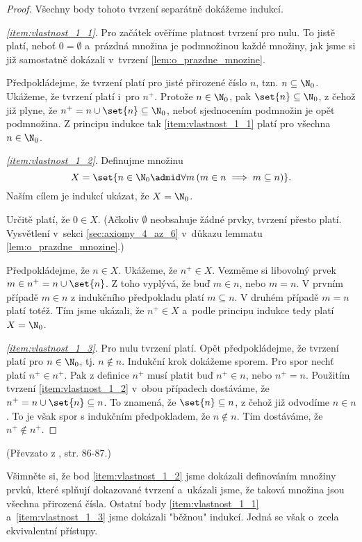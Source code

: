 \begin{proof}
    Všechny body tohoto tvrzení separátně dokážeme indukcí.\par
    \textit{\ref{item:vlastnost_1_1}}. Pro začátek ověříme platnost tvrzení pro nulu. To jistě platí, neboť $0=\emptyset$ a~prázdná množina je podmnožinou každé množiny, jak jsme si již samostatně dokázali v~tvrzení \ref{lem:o_prazdne_mnozine}.\par
    Předpokládejme, že tvrzení platí pro jisté přirozené číslo $n$, tzn. $n\subseteq\N_0$. Ukážeme, že tvrzení platí i~pro $n^+$. Protože $n\in\N_0$, pak $\set{n}\subseteq\N_0$, z čehož již plyne, že $n^+=n\cup\set{n}\subseteq\N_0$, neboť sjednocením podmnožin je opět podmnožina. Z principu indukce tak \ref{item:vlastnost_1_1} platí pro všechna $n\in\N_0$.\par
    \textit{\ref{item:vlastnost_1_2}}. Definujme množinu
    \begin{equation*}
        X=\set{n\in\N_0\admid \forall m\,(m\in n\implies m\subseteq n)}.
    \end{equation*} 
    Naším cílem je indukcí ukázat, že $X=\N_0$.\par
    Určitě platí, že $0\in X$. (Ačkoliv $\emptyset$ neobsahuje žádné prvky, tvrzení přesto platí. Vysvětlení v~sekci \ref{sec:axiomy_4_az_6} v~důkazu lemmatu \ref{lem:o_prazdne_mnozine}.)\par
    Předpokládejme, že $n\in X$. Ukážeme, že $n^+\in X$. Vezměme si libovolný prvek $m\in n^+=n\cup\set{n}$. Z toho vyplývá, že buď $m\in n$, nebo $m=n$. V prvním případě $m\in n$ z indukčního předpokladu platí $m\subseteq n$. V druhém případě $m=n$ platí totéž. Tím jsme ukázali, že $n^+\in X$ a~podle principu indukce tedy platí $X=\N_0$.\par
    \textit{\ref{item:vlastnost_1_3}}. Pro nulu tvrzení platí. Opět předpokládejme, že tvrzení platí pro $n\in\N_0$, tj. $n\notin n$. Indukční krok dokážeme sporem. Pro spor nechť platí $n^+\in n^+$. Pak z definice $n^+$ musí platit buď $n^+\in n$, nebo $n^+=n$. Použitím tvrzení \ref{item:vlastnost_1_2} v~obou případech dostáváme, že $n^+=n\cup\set{n}\subseteq n$. To znamená, že $\set{n}\subseteq n$, z čehož již odvodíme $n\in n$. To je však spor s indukčním předpokladem, že $n\notin n$. Tím dostáváme, že $n^+\notin n^+$.
\end{proof}
(Převzato z \cite{BalcarStepanek1986}, str. 86-87.)\par
Všimněte si, že bod \ref{item:vlastnost_1_2} jsme dokázali definováním množiny prvků, které splňují dokazované tvrzení a~ukázali jsme, že taková množina jsou všechna přirozená čísla. Ostatní body \ref{item:vlastnost_1_1} a~\ref{item:vlastnost_1_3} jsme dokázali "běžnou" indukcí. Jedná se však o~zcela ekvivalentní přístupy.
\medskip

